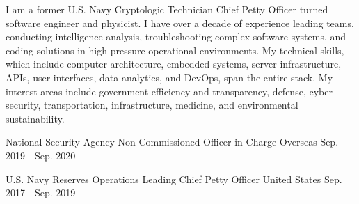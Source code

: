 \documentclass[11pt, a4paper]{cv}
\newenvironment{header}{}{\par}
\newenvironment{summary}{}{\par}
\newenvironment{experience}{}{\par}
\newenvironment{cv}{}{\par}
\begin{document}
\begin{header}
\address{Brooklyn, NY}
\mobile{}
\makeheader[C]
\end{header}
\bigskip
\begin{cv}
\begin{summary}
\begin{cvparagraph}
I am a former U.S. Navy Cryptologic Technician Chief Petty Officer turned software engineer and physicist. I have over a decade of experience leading teams, conducting intelligence analysis, troubleshooting complex software systems, and coding solutions in high-pressure operational environments. My technical skills, which include computer architecture, embedded systems, server infrastructure, APIs, user interfaces, data analytics, and DevOps, span the entire stack. My interest areas include government efficiency and transparency, defense, cyber security, transportation, infrastructure, medicine, and environmental sustainability.
\end{cvparagraph}
\end{summary}
\begin{experience}
\begin{cventries}
\cventry
{National Security Agency}
{Non-Commissioned Officer in Charge}
{Overseas}
{Sep. 2019 - Sep. 2020}
{\begin{cvitems}
\end{cvitems}}
\cventry
{U.S. Navy Reserves}
{Operations Leading Chief Petty Officer}
{United States}
{Sep. 2017 - Sep. 2019}
{\begin{cvitems}

\end{cvitems}}
\end{cventries}
\end{experience}
\end{cv}
\end{document}
